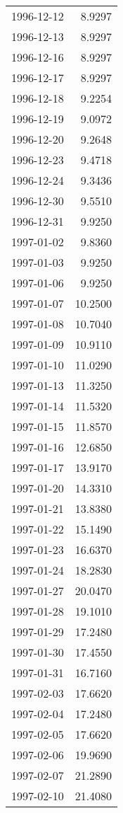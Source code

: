 \begin{tabular}{lr}
1996-12-12 &      8.9297 \\
1996-12-13 &      8.9297 \\
1996-12-16 &      8.9297 \\
1996-12-17 &      8.9297 \\
1996-12-18 &      9.2254 \\
1996-12-19 &      9.0972 \\
1996-12-20 &      9.2648 \\
1996-12-23 &      9.4718 \\
1996-12-24 &      9.3436 \\
1996-12-30 &      9.5510 \\
1996-12-31 &      9.9250 \\
1997-01-02 &      9.8360 \\
1997-01-03 &      9.9250 \\
1997-01-06 &      9.9250 \\
1997-01-07 &     10.2500 \\
1997-01-08 &     10.7040 \\
1997-01-09 &     10.9110 \\
1997-01-10 &     11.0290 \\
1997-01-13 &     11.3250 \\
1997-01-14 &     11.5320 \\
1997-01-15 &     11.8570 \\
1997-01-16 &     12.6850 \\
1997-01-17 &     13.9170 \\
1997-01-20 &     14.3310 \\
1997-01-21 &     13.8380 \\
1997-01-22 &     15.1490 \\
1997-01-23 &     16.6370 \\
1997-01-24 &     18.2830 \\
1997-01-27 &     20.0470 \\
1997-01-28 &     19.1010 \\
1997-01-29 &     17.2480 \\
1997-01-30 &     17.4550 \\
1997-01-31 &     16.7160 \\
1997-02-03 &     17.6620 \\
1997-02-04 &     17.2480 \\
1997-02-05 &     17.6620 \\
1997-02-06 &     19.9690 \\
1997-02-07 &     21.2890 \\
1997-02-10 &     21.4080 \\

\end{tabular}
